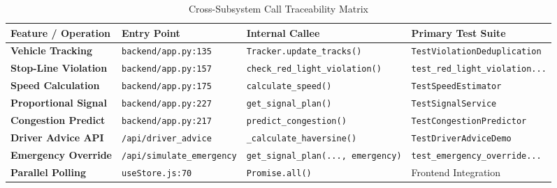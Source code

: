 \begin{table}[h!]
\centering
\small
\begin{tabularx}{\textwidth}{p{3.8cm} p{3.2cm} p{3.2cm} X}
\toprule
\textbf{Feature / Operation} & \textbf{Entry Point} & \textbf{Internal Callee} & \textbf{Primary Test Suite} \\
\midrule
\textbf{Vehicle Tracking} & \texttt{backend/app.py:135} & \texttt{Tracker.update\_tracks()} & \texttt{TestViolationDeduplication} \\
\textbf{Stop-Line Violation} & \texttt{backend/app.py:157} & \texttt{check\_red\_light\_violation()} & \texttt{test\_red\_light\_violation...} \\
\textbf{Speed Calculation} & \texttt{backend/app.py:175} & \texttt{calculate\_speed()} & \texttt{TestSpeedEstimator} \\
\textbf{Proportional Signal} & \texttt{backend/app.py:227} & \texttt{get\_signal\_plan()} & \texttt{TestSignalService} \\
\textbf{Congestion Predict} & \texttt{backend/app.py:217} & \texttt{predict\_congestion()} & \texttt{TestCongestionPredictor} \\
\textbf{Driver Advice API} & \texttt{/api/driver\_advice} & \texttt{\_calculate\_haversine()} & \texttt{TestDriverAdviceDemo} \\
\textbf{Emergency Override} & \texttt{/api/simulate\_emergency} & \texttt{get\_signal\_plan(..., emergency)} & \texttt{test\_emergency\_override...} \\
\textbf{Parallel Polling} & \texttt{useStore.js:70} & \texttt{Promise.all()} & Frontend Integration \\
\bottomrule
\end{tabularx}
\caption{Cross-Subsystem Call Traceability Matrix}
\label{tab:code_nav}
\end{table}
